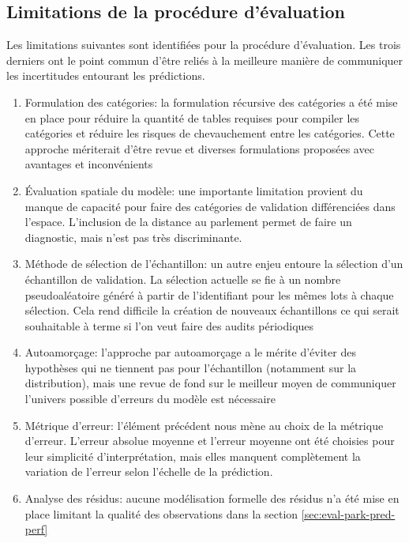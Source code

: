     \subsection{Limitations de la procédure d'évaluation}
        Les limitations suivantes sont identifiées pour la procédure d'évaluation. Les trois derniers ont le point commun d'être reliés à la meilleure manière de communiquer les incertitudes entourant les prédictions.
        \begin{enumerate}
            \item Formulation des catégories: la formulation récursive des catégories a été mise en place pour réduire la quantité de tables requises pour compiler les catégories et réduire les risques de chevauchement entre les catégories. Cette approche mériterait d'être revue et diverses formulations proposées avec avantages et inconvénients
            \item Évaluation spatiale du modèle: une importante limitation provient du manque de capacité pour faire des catégories de validation différenciées dans l'espace. L'inclusion de la distance au parlement permet de faire un diagnostic, mais n'est pas très discriminante. 
            \item Méthode de sélection de l'échantillon: un autre enjeu entoure la sélection d'un échantillon de validation. La sélection actuelle se fie à un nombre pseudoaléatoire généré à partir de l'identifiant pour les mêmes lots à chaque sélection. Cela rend difficile la création de nouveaux échantillons ce qui serait souhaitable à terme si l'on veut faire des audits périodiques
            \item Autoamorçage: l'approche par autoamorçage a le mérite d'éviter des hypothèses qui ne tiennent pas pour l'échantillon (notamment sur la distribution), mais une revue de fond sur le meilleur moyen de communiquer l'univers possible d'erreurs du modèle est nécessaire
            \item Métrique d'erreur: l'élément précédent nous mène au choix de la métrique d'erreur. L'erreur absolue moyenne et l'erreur moyenne ont été choisies pour leur simplicité d'interprétation, mais elles manquent complètement la variation de l'erreur selon l'échelle de la prédiction.
            \item Analyse des résidus: aucune modélisation formelle des résidus n'a été mise en place limitant la qualité des observations dans la section \ref{sec:eval-park-pred-perf}
        \end{enumerate}
